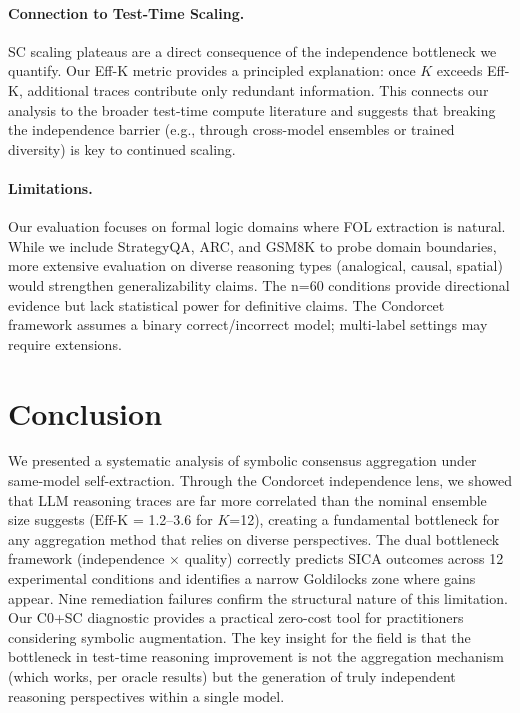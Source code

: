 \documentclass[11pt,a4paper]{article}
\newcommand{\effk}{\text{Eff-K}}
\begin{document}
\paragraph{Connection to Test-Time Scaling.} SC scaling plateaus \cite{loo2025scaling} are a direct consequence of the independence bottleneck we quantify. Our Eff-K metric provides a principled explanation: once $K$ exceeds Eff-K, additional traces contribute only redundant information. This connects our analysis to the broader test-time compute literature and suggests that breaking the independence barrier (e.g., through cross-model ensembles or trained diversity) is key to continued scaling.

\paragraph{Limitations.} Our evaluation focuses on formal logic domains where FOL extraction is natural. While we include StrategyQA, ARC, and GSM8K to probe domain boundaries, more extensive evaluation on diverse reasoning types (analogical, causal, spatial) would strengthen generalizability claims. The n=60 conditions provide directional evidence but lack statistical power for definitive claims. The Condorcet framework assumes a binary correct/incorrect model; multi-label settings may require extensions.

\section{Conclusion}

We presented a systematic analysis of symbolic consensus aggregation under same-model self-extraction. Through the Condorcet independence lens, we showed that LLM reasoning traces are far more correlated than the nominal ensemble size suggests ($\effk$ = 1.2--3.6 for $K$=12), creating a fundamental bottleneck for any aggregation method that relies on diverse perspectives. The dual bottleneck framework (independence $\times$ quality) correctly predicts SICA outcomes across 12 experimental conditions and identifies a narrow Goldilocks zone where gains appear. Nine remediation failures confirm the structural nature of this limitation. Our C0+SC diagnostic provides a practical zero-cost tool for practitioners considering symbolic augmentation. The key insight for the field is that the bottleneck in test-time reasoning improvement is not the aggregation mechanism (which works, per oracle results) but the generation of truly independent reasoning perspectives within a single model.
\end{document}

